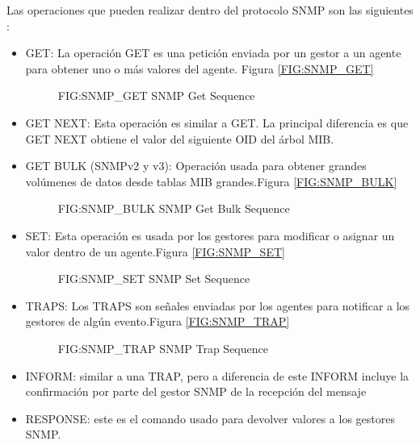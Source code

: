 Las operaciones que pueden realizar dentro del protocolo SNMP son las siguientes
\cite{mauro2005essential}:

\begin{itemize}
    \item GET: La operación GET es una petición enviada por un gestor a un agente para obtener uno o
    más valores del agente. Figura \ref{FIG:SNMP_GET}

    \begin{figure}
        [SNMP Get Sequence]
        {FIG:SNMP_GET}
        {SNMP Get Sequence}
    \end{figure}
    
    \item GET NEXT: Esta operación es similar a GET. La principal diferencia es que GET NEXT obtiene
    el valor del siguiente OID del árbol MIB.
    \item GET BULK (SNMPv2 y v3): Operación usada para obtener grandes volúmenes de datos desde tablas
    MIB grandes.Figura \ref{FIG:SNMP_BULK}
    
    \begin{figure}
        [SNMP Get Bulk Sequence]
        {FIG:SNMP_BULK}
        {SNMP Get Bulk Sequence}
    \end{figure}

    \item SET: Esta operación es usada por los gestores para modificar o asignar un valor dentro de un
    agente.Figura \ref{FIG:SNMP_SET}
    
    \begin{figure}
        [SNMP Set Sequence]
        {FIG:SNMP_SET}
        {SNMP Set Sequence}
    \end{figure}
    
    \item TRAPS: Los TRAPS son señales enviadas por los agentes para notificar a los gestores de algún
    evento.Figura \ref{FIG:SNMP_TRAP}

    \begin{figure}
        [SNMP Trap Sequence]
        {FIG:SNMP_TRAP}
        {SNMP Trap Sequence}
    \end{figure}
  
    \item INFORM: similar a una TRAP, pero a diferencia de este INFORM incluye la confirmación por
    parte del gestor \gls{SNMP} de la recepción del mensaje
    \item RESPONSE: este es el comando usado para devolver valores a los gestores SNMP.
\end{itemize}







